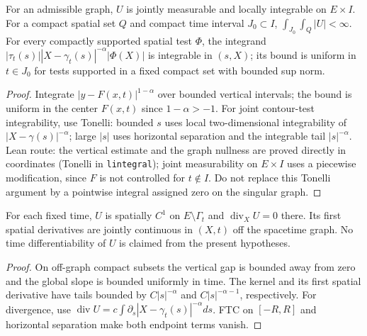 \begin{lemma}
  \label{lem:c13_velocity_local_integrable}
  For an admissible graph, $U$ is jointly measurable and locally integrable on $E\times I$.
  For a compact spatial set $Q$ and compact time interval $J_0\subset I$,
  $\int_{J_0}\int_Q|U|<\infty$.
  For every compactly supported spatial test $\Phi$, the integrand
  $|\tau_t(s)||X-\gamma_t(s)|^{-\alpha}|\Phi(X)|$ is integrable in $(s,X)$;
  its bound is uniform in $t\in J_0$ for tests supported in a fixed compact set with bounded sup norm.
\end{lemma}
\begin{proof}
  Integrate $|y-F(x,t)|^{1-\alpha}$ over bounded vertical intervals; the bound is uniform
  in the center $F(x,t)$ since $1-\alpha>-1$. For joint contour-test integrability, use Tonelli:
  bounded $s$ uses local two-dimensional integrability of $|X-\gamma(s)|^{-\alpha}$;
  large $|s|$ uses horizontal separation and the integrable tail $|s|^{-\alpha}$.
  Lean route: the vertical estimate and the graph nullness are proved directly in coordinates
  (Tonelli in \texttt{lintegral}); joint measurability on $E\times I$ uses a piecewise modification,
  since $F$ is not controlled for $t\notin I$.
  Do not replace this Tonelli argument by a pointwise integral assigned zero on the singular graph.
\end{proof}

\begin{lemma}
  \label{lem:c13_velocity_divergence}
  For each fixed time, $U$ is spatially $C^1$ on $E\setminus\Gamma_t$ and
  $\operatorname{div}_X U=0$ there. Its first spatial derivatives are jointly continuous in $(X,t)$
  off the spacetime graph. No time differentiability of $U$ is claimed from the present hypotheses.
\end{lemma}
\begin{proof}
  On off-graph compact subsets the vertical gap is bounded away from zero and the global slope
  is bounded uniformly in time. The kernel and its first spatial derivative have tails
  bounded by $C|s|^{-\alpha}$ and $C|s|^{-\alpha-1}$, respectively. For divergence, use
  $\operatorname{div}U=c\int\partial_s|X-\gamma_t(s)|^{-\alpha}ds$.
  FTC on $[-R,R]$ and horizontal separation make both endpoint terms vanish.
\end{proof}


